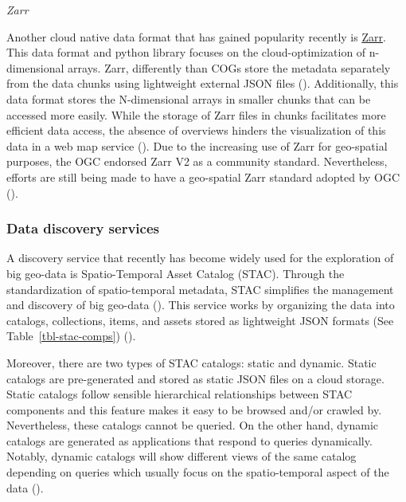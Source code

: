 \documentclass[
  oneside,
  open=any]{scrbook}
\begin{document}
\emph{Zarr}

Another cloud native data format that has gained popularity recently is
\href{https://zarr.readthedocs.io/en/stable/}{Zarr}. This data format
and python library focuses on the cloud-optimization of n-dimensional
arrays. Zarr, differently than COGs store the metadata separately from
the data chunks using lightweight external JSON files
().
Additionally, this data format stores the N-dimensional arrays in
smaller chunks that can be accessed more easily. While the storage of
Zarr files in chunks facilitates more efficient data access, the absence
of overviews hinders the visualization of this data in a web map service
(). Due
to the increasing use of Zarr for geo-spatial purposes, the OGC endorsed
Zarr V2 as a community standard. Nevertheless, efforts are still being
made to have a geo-spatial Zarr standard adopted by OGC
().

\subsubsection*{Data discovery services}\label{data-discovery-services}

A discovery service that recently has become widely used for the
exploration of big geo-data is Spatio-Temporal Asset Catalog (STAC).
Through the standardization of spatio-temporal metadata, STAC simplifies
the management and discovery of big geo-data
(). This
service works by organizing the data into catalogs, collections, items,
and assets stored as lightweight JSON formats (See
Table~\ref{tbl-stac-comps}) ().

Moreover, there are two types of STAC catalogs: static and dynamic.
Static catalogs are pre-generated and stored as static JSON files on a
cloud storage. Static catalogs follow sensible hierarchical
relationships between STAC components and this feature makes it easy to
be browsed and/or crawled by. Nevertheless, these catalogs cannot be
queried. On the other hand, dynamic catalogs are generated as
applications that respond to queries dynamically. Notably, dynamic
catalogs will show different views of the same catalog depending on
queries which usually focus on the spatio-temporal aspect of the data
().
\end{document}
